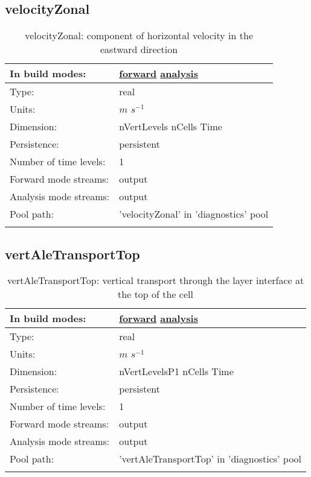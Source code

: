 \subsection[velocityZonal]{velocityZonal}
\label{subsec:var_sec_diagnostics_velocityZonal}
\begin{center}
\begin{longtable}{| p{2.0in} | p{4.0in} |}
        \hline 
        In build modes: & \hyperref[subsec:forward_var_tab_diagnostics]{forward} \hyperref[subsec:analysis_var_tab_diagnostics]{analysis} \\
        \hline 
        Type: & real \\
        \hline 
        Units: & $m$ $s^{-1}$ \\
        \hline 
        Dimension: & nVertLevels nCells Time \\
        \hline 
        Persistence: & persistent \\
        \hline 
        Number of time levels: & 1 \\
        \hline 
		 Forward mode streams: &  output \\
        \hline 
		 Analysis mode streams: &  output \\
        \hline 
            Pool path: & 'velocityZonal' in 'diagnostics' pool
 \\
		 \hline 
    \caption{velocityZonal: component of horizontal velocity in the eastward direction}
\end{longtable}
\end{center}
\subsection[vertAleTransportTop]{vertAleTransportTop}
\label{subsec:var_sec_diagnostics_vertAleTransportTop}
\begin{center}
\begin{longtable}{| p{2.0in} | p{4.0in} |}
        \hline 
        In build modes: & \hyperref[subsec:forward_var_tab_diagnostics]{forward} \hyperref[subsec:analysis_var_tab_diagnostics]{analysis} \\
        \hline 
        Type: & real \\
        \hline 
        Units: & $m$ $s^{-1}$ \\
        \hline 
        Dimension: & nVertLevelsP1 nCells Time \\
        \hline 
        Persistence: & persistent \\
        \hline 
        Number of time levels: & 1 \\
        \hline 
		 Forward mode streams: &  output \\
        \hline 
		 Analysis mode streams: &  output \\
        \hline 
            Pool path: & 'vertAleTransportTop' in 'diagnostics' pool
 \\
		 \hline 
    \caption{vertAleTransportTop: vertical transport through the layer interface at the top of the cell}
\end{longtable}
\end{center}
